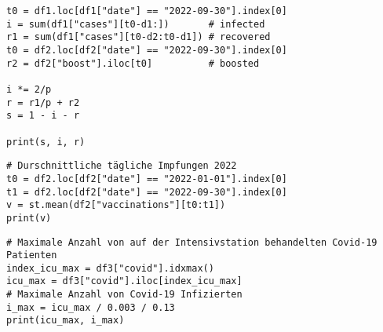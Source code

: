 \documentclass[../main.tex]{subfiles}
\begin{document}
\begin{lstlisting}[title=Bestimmung des Anfangszustands:]
t0 = df1.loc[df1["date"] == "2022-09-30"].index[0]
i = sum(df1["cases"][t0-d1:])       # infected
r1 = sum(df1["cases"][t0-d2:t0-d1]) # recovered
t0 = df2.loc[df2["date"] == "2022-09-30"].index[0]
r2 = df2["boost"].iloc[t0]          # boosted

i *= 2/p
r = r1/p + r2
s = 1 - i - r

print(s, i, r)
\end{lstlisting}

\begin{lstlisting}[title=Bestimmung der Impfrate:]
# Durschnittliche tägliche Impfungen 2022
t0 = df2.loc[df2["date"] == "2022-01-01"].index[0]
t1 = df2.loc[df2["date"] == "2022-09-30"].index[0]
v = st.mean(df2["vaccinations"][t0:t1])
print(v)
\end{lstlisting}

\begin{lstlisting}[title=Bestimmung der Kapazität des Gesundheitssystems:]
# Maximale Anzahl von auf der Intensivstation behandelten Covid-19 Patienten
index_icu_max = df3["covid"].idxmax()
icu_max = df3["covid"].iloc[index_icu_max]
# Maximale Anzahl von Covid-19 Infizierten
i_max = icu_max / 0.003 / 0.13
print(icu_max, i_max)
\end{lstlisting}
\end{document}
